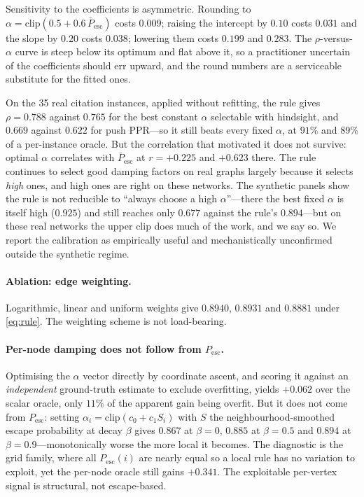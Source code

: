 \documentclass[11pt,a4paper]{article}
\newcommand{\Pesc}{P_{\mathrm{esc}}}
\newcommand{\Pescbar}{\bar{P}_{\mathrm{esc}}}
\newcommand{\clip}{\mathrm{clip}}
\begin{document}
Sensitivity to the coefficients is asymmetric. Rounding to
$\alpha=\clip(0.5+0.6\,\Pescbar)$ costs $0.009$; raising the intercept by $0.10$
costs $0.031$ and the slope by $0.20$ costs $0.038$; lowering them costs $0.199$
and $0.283$. The $\rho$-versus-$\alpha$ curve is steep below its optimum and
flat above it, so a practitioner uncertain of the coefficients should err
upward, and the round numbers are a serviceable substitute for the fitted ones.

On the 35 real citation instances, applied without refitting, the rule gives
$\rho=0.788$ against $0.765$ for the best constant $\alpha$ selectable with
hindsight, and $0.669$ against $0.622$ for push PPR---so it still beats every
fixed $\alpha$, at $91\%$ and $89\%$ of a per-instance oracle. But the
correlation that motivated it does not survive: optimal $\alpha$ correlates with
$\Pescbar$ at $r=+0.225$ and $+0.623$ there. The rule continues to select good
damping factors on real graphs largely because it selects \emph{high} ones, and
high ones are right on these networks. The synthetic panels show the rule is
not reducible to ``always choose a high $\alpha$''---there the best fixed
$\alpha$ is itself high ($0.925$) and still reaches only $0.677$ against the
rule's $0.894$---but on these real networks the upper clip does much of the
work, and we say so. We report the calibration as empirically useful and
mechanistically unconfirmed outside the synthetic regime.

\paragraph{Ablation: edge weighting.} Logarithmic, linear and uniform weights
give $0.8940$, $0.8931$ and $0.8881$ under \eqref{eq:rule}. The weighting scheme
is not load-bearing.

\paragraph{Per-node damping does not follow from $\Pesc$.} Optimising the
$\alpha$ vector directly by coordinate ascent, and scoring it against an
\emph{independent} ground-truth estimate to exclude overfitting, yields $+0.062$
over the scalar oracle, only $11\%$ of the apparent gain being overfit. But it
does not come from $\Pesc$: setting $\alpha_i=\clip(c_0+c_1S_i)$ with $S$ the
neighbourhood-smoothed escape probability at decay $\beta$ gives $0.867$ at
$\beta=0$, $0.885$ at $\beta=0.5$ and $0.894$ at $\beta=0.9$---monotonically
worse the more local it becomes. The diagnostic is the grid family, where all
$\Pesc(i)$ are nearly equal so a local rule has no variation to exploit, yet the
per-node oracle still gains $+0.341$. The exploitable per-vertex signal is
structural, not escape-based.
\end{document}
